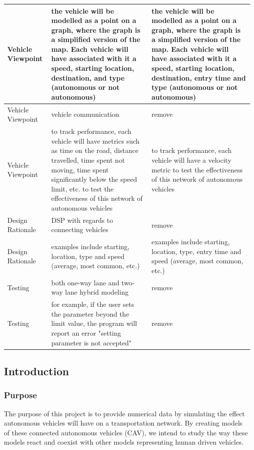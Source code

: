 \documentclass[onecolumn, draftclsnofoot,10pt, compsoc]{IEEEtran}
\begin{document}
\begin{table}[h]
\begin{tabular}{|p{1in}|p{2.5in}|p{2.5in}|}
Vehicle Viewpoint                               & the vehicle will be modelled as a point on a graph, where the graph is a simplified version of the map. Each vehicle will have associated with it a speed, starting location, destination, and type (autonomous or not autonomous) & the vehicle will be modelled as a point on a graph, where the graph is a simplified version of the map. Each vehicle will have associated with it a speed, starting location, destination, entry time and type (autonomous or not autonomous) \\ \hline
Vehicle Viewpoint                               & vehicle communication & remove \\ \hline
Vehicle Viewpoint                               & to track performance, each vehicle will have metrics such as time on the road, distance travelled, time spent not moving, time spent significantly below the speed limit, etc. to test the effectiveness of this network of autonomous vehicles & to track performance, each vehicle will have a velocity metric to test the effectiveness of this network of autonomous vehicles \\ \hline
Design Rationale                                & DSP with regards to connecting vehicles & remove \\ \hline
Design Rationale                                & examples include starting, location, type and speed (average, most common, etc.) & examples include starting, location, type, entry time and speed (average, most common, etc.) \\ \hline
Testing                                         & both one-way lane and two-way lane hybrid modeling & remove \\ \hline
Testing                                         & for example, if the user sets the parameter beyond the limit value, the program will report an error "setting parameter is not accepted" & remove \\ \hline
\end{tabular}
\end{table}
\subsection{Introduction}
\subsubsection{Purpose}
The purpose of this project is to provide numerical data by simulating the effect autonomous vehicles will have on a transportation network.
By creating models of these connected autonomous vehicles (CAV), we intend to study the way these models react and coexist with other models representing human driven vehicles.
\end{document}

